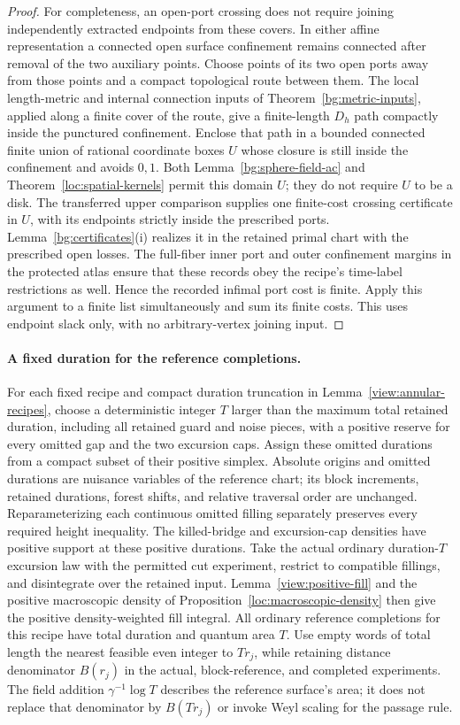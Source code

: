 \begin{proof}
For completeness, an open-port crossing does not require joining
independently extracted endpoints from these covers.  In either affine
representation a connected open surface confinement remains connected
after removal of the two auxiliary points.  Choose points of its two
open ports away from those points and a compact topological route
between them.  The local length-metric and internal connection inputs
of Theorem~\ref{bg:metric-inputs}, applied along a finite cover of the
route, give a finite-length $D_h$ path compactly inside the punctured
confinement.  Enclose that path in a bounded connected finite union of
rational coordinate boxes $U$ whose closure is still inside the
confinement and avoids $0,1$.  Both
Lemma~\ref{bg:sphere-field-ac} and
Theorem~\ref{loc:spatial-kernels} permit this domain $U$; they do not
require $U$ to be a disk.  The transferred upper comparison supplies
one finite-cost crossing certificate in $U$, with its endpoints
strictly inside the prescribed ports.  Lemma~\ref{bg:certificates}(i)
realizes it in the retained primal chart with the prescribed open
losses.  The full-fiber inner port and outer confinement margins in
the protected atlas ensure that these records obey the recipe's
time-label restrictions as well.  Hence the recorded infimal port cost
is finite.  Apply this
argument to a finite list simultaneously and sum its finite costs.
This uses endpoint slack only, with no arbitrary-vertex joining input.
\end{proof}

\paragraph{A fixed duration for the reference completions.}
For each fixed recipe and compact duration truncation in
Lemma~\ref{view:annular-recipes}, choose a deterministic integer $T$
larger than the maximum total retained duration, including all retained
guard and noise pieces, with a positive reserve for
every omitted gap and the two excursion caps.  Assign these omitted
durations from a compact subset of their positive simplex.  Absolute
origins and omitted durations are nuisance variables of the reference
chart; its block increments, retained durations, forest shifts, and
relative traversal order are unchanged.  Reparameterizing each
continuous omitted filling separately preserves every required height
inequality.  The killed-bridge and excursion-cap densities have positive
support at these positive durations.  Take the actual ordinary
duration-$T$ excursion law with the permitted cut experiment, restrict
to compatible fillings, and disintegrate over the retained input.
Lemma~\ref{view:positive-fill} and the positive macroscopic density of
Proposition~\ref{loc:macroscopic-density} then give the positive
density-weighted fill integral.  All ordinary reference completions for
this recipe have total duration and quantum area $T$.  Use empty words of total length
the nearest feasible even integer to $Tr_j$, while retaining distance
denominator $B(r_j)$ in the actual, block-reference, and completed
experiments.  The field addition $\gamma^{-1}\log T$ describes the
reference surface's area; it does not replace that denominator by
$B(Tr_j)$ or invoke Weyl scaling for the passage rule.


